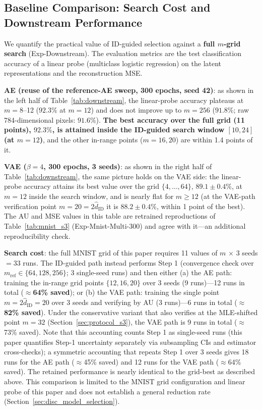 \documentclass[make,article,submit,pdftex,moreauthors]{Definitions/mdpi}
\newcommand{\hatdID}{\hat{d}_{\mathrm{ID}}}
\begin{document}
\subsection{Baseline Comparison: Search Cost and Downstream Performance}\label{sec:exp_downstream}

We quantify the practical value of ID-guided selection against a
\textbf{full $m$-grid search} (Exp-Downstream).
The evaluation metrics are the test classification accuracy of a linear
probe (multiclass logistic regression) on the latent representations and the
reconstruction MSE.

\textbf{AE (reuse of the reference-AE sweep, 300 epochs, seed 42)}:
as shown in the left half of Table~\ref{tab:downstream},
the linear-probe accuracy plateaus at $m = 8$--12 ($92.3\%$ at $m = 12$)
and does not improve up to $m = 256$ ($91.8\%$; raw 784-dimensional pixels:
$91.6\%$).
\textbf{The best accuracy over the full grid (11 points), $92.3\%$, is
attained inside the ID-guided search window $[10, 24]$ (at $m = 12$)},
and the other in-range points ($m = 16, 20$) are within 1.4 points of it.

\textbf{VAE ($\beta = 4$, 300 epochs, 3 seeds)}:
as shown in the right half of Table~\ref{tab:downstream}, the same picture
holds on the VAE side: the linear-probe accuracy attains its best value over
the grid $\{4, \ldots, 64\}$, $89.1 \pm 0.4\%$, at $m = 12$ inside the
search window, and is nearly flat for $m \geq 12$
(at the VAE-path verification point $m = 20 = 2\hatdID$ it is
$88.2 \pm 0.4\%$, within 1 point of the best).
The AU and MSE values in this table are retrained reproductions of
Table~\ref{tab:mnist_s3} (Exp-Mnist-Multi-300) and agree with it---an
additional reproducibility check.

\textbf{Search cost}: the full MNIST grid of this paper requires 11 values
of $m$ $\times$ 3 seeds $= 33$ runs.
The ID-guided path instead performs Step 1 (convergence check over
$m_{\mathrm{ref}} \in \{64, 128, 256\}$; 3 single-seed runs) and then either
(a) the AE path: training the in-range grid points $\{12, 16, 20\}$ over 3
seeds (9 runs)---12 runs in total (\textbf{$\approx$64\% saved}); or
(b) the VAE path: training the single point $m = 2\hatdID = 20$ over 3 seeds
and verifying by AU (3 runs)---6 runs in total
(\textbf{$\approx$82\% saved}).
Under the conservative variant that also verifies at the MLE-shifted point
$m = 32$ (Section~\ref{sec:protocol_s3}), the VAE path is 9 runs in total
($\approx$73\% saved).
Note that this accounting counts Step 1 as single-seed runs (this paper
quantifies Step-1 uncertainty separately via subsampling CIs and estimator
cross-checks); a symmetric accounting that repeats Step 1 over 3 seeds
gives 18 runs for the AE path ($\approx$45\% saved) and 12 runs for the VAE
path ($\approx$64\% saved).
The retained performance is nearly identical to the grid-best as described
above.
This comparison is limited to the MNIST grid configuration and linear probe
of this paper and does not establish a general reduction rate
(Section~\ref{sec:disc_model_selection}).
\end{document}
